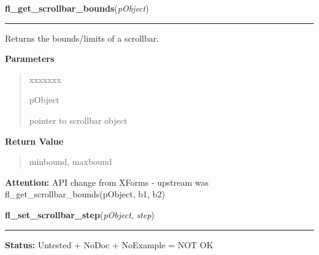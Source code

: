 \hspace{.8\funcindent}\begin{boxedminipage}{\funcwidth}

    \raggedright \textbf{fl\_get\_scrollbar\_bounds}(\textit{pObject})

    \vspace{-1.5ex}

    \rule{\textwidth}{0.5\fboxrule}
\setlength{\parskip}{2ex}
    Returns the bounds/limits of a scrollbar.

\setlength{\parskip}{1ex}
      \textbf{Parameters}
      \vspace{-1ex}

      \begin{quote}
        \begin{Ventry}{xxxxxxx}

          \item[pObject]

          pointer to scrollbar object

        \end{Ventry}

      \end{quote}

      \textbf{Return Value}
    \vspace{-1ex}

      \begin{quote}
      minbound, maxbound

      \end{quote}

\textbf{Attention:} API change from XForms - upstream was fl\_get\_scrollbar\_bounds(pObject, 
b1, b2)



    \end{boxedminipage}

    \label{xformslib:library:fl_set_scrollbar_step}

    \vspace{0.5ex}

\hspace{.8\funcindent}\begin{boxedminipage}{\funcwidth}

    \raggedright \textbf{fl\_set\_scrollbar\_step}(\textit{pObject}, \textit{step})

    \vspace{-1.5ex}

    \rule{\textwidth}{0.5\fboxrule}
\setlength{\parskip}{2ex}
\setlength{\parskip}{1ex}
\textbf{Status:} Untested + NoDoc + NoExample = NOT OK



    \end{boxedminipage}

